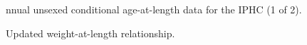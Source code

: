 \documentclass[
]{scrartcl}
\begin{document}
\begin{figure}


\caption{\label{fig-IPHC_agecomps2}nnual unsexed conditional
age-at-length data for the IPHC (1 of 2).}

\end{figure}%

\begin{figure}


\caption{\label{fig-LWrel}Updated weight-at-length relationship.}

\end{figure}%
\end{document}
